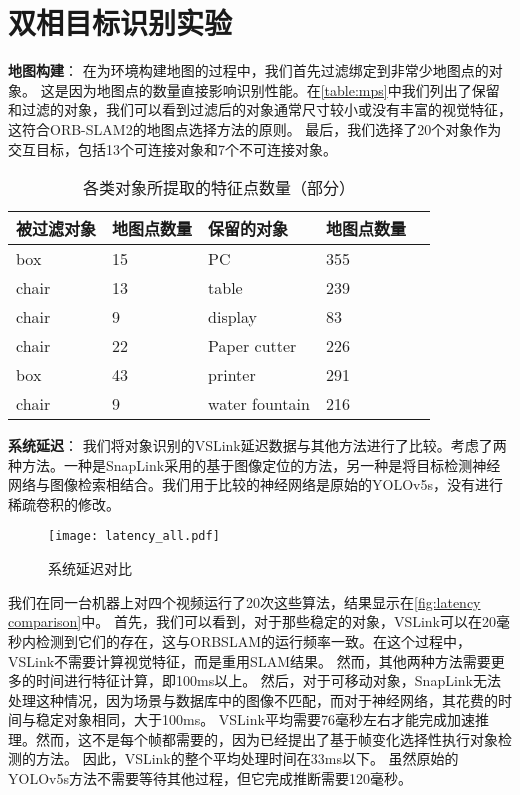 \section{双相目标识别实验}

\textbf{地图构建}：
在为环境构建地图的过程中，我们首先过滤绑定到非常少地图点的对象。
这是因为地图点的数量直接影响识别性能。在\autoref{table:mps}中我们列出了保留和过滤的对象，我们可以看到过滤后的对象通常尺寸较小或没有丰富的视觉特征，这符合ORB-SLAM2\cite{mur2017orb}的地图点选择方法的原则。
最后，我们选择了20个对象作为交互目标，包括13个可连接对象和7个不可连接对象。

\begin{table}[htbp]
	\caption{各类对象所提取的特征点数量（部分）}  \label{table:mps} 
	\begin{center}  
		\begin{tabular}{|l|l|l|l| p{4cm}|}  
			\hline  
			\textbf{被过滤对象} & \textbf{地图点数量} & \textbf{保留的对象} & \textbf{地图点数量}\\ \hline  
			box & 15 & PC & 355  \\ \hline 
			chair & 13 & table & 239  \\ \hline 
			chair & 9 & display & 83  \\ \hline  
			chair & 22 & Paper cutter & 226  \\ \hline  
			box & 43 & printer & 291  \\ \hline  
			chair & 9 & water fountain & 216  \\ \hline  
		\end{tabular}  
	\end{center}  
\end{table} 

\textbf{系统延迟}：
我们将对象识别的VSLink延迟数据与其他方法进行了比较。考虑了两种方法。一种是SnapLink\cite{chen2018snaplink}采用的基于图像定位的方法，另一种是将目标检测神经网络与图像检索相结合。我们用于比较的神经网络是原始的YOLOv5s\cite{glenn_jocher_2020_4154370}，没有进行稀疏卷积的修改。

\begin{figure}[htbp]
	\centering
	\texttt{[image: latency\_all.pdf]}
	\caption{系统延迟对比}
	\label{fig:latency comparison}
\end{figure}

我们在同一台机器上对四个视频运行了20次这些算法，结果显示在\autoref{fig:latency comparison}中。
首先，我们可以看到，对于那些稳定的对象，VSLink可以在20毫秒内检测到它们的存在，这与ORBSLAM的运行频率一致。在这个过程中，VSLink不需要计算视觉特征，而是重用SLAM结果。
然而，其他两种方法需要更多的时间进行特征计算，即100ms以上。
然后，对于可移动对象，SnapLink无法处理这种情况，因为场景与数据库中的图像不匹配，而对于神经网络，其花费的时间与稳定对象相同，大于100ms。
VSLink平均需要76毫秒左右才能完成加速推理。然而，这不是每个帧都需要的，因为\cite{yao2020video}已经提出了基于帧变化选择性执行对象检测的方法。
因此，VSLink的整个平均处理时间在33ms以下。
虽然原始的YOLOv5s方法不需要等待其他过程，但它完成推断需要120毫秒。
 
